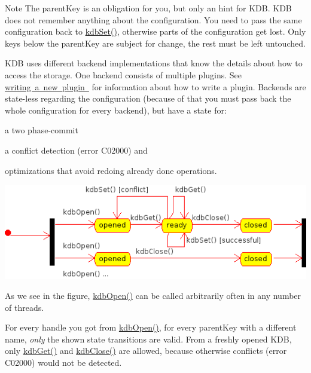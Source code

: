 \begin{DoxyNote}{Note}
The parent\+Key is an obligation for you, but only an hint for K\+DB. K\+DB does not remember anything about the configuration. You need to pass the same configuration back to \mbox{\hyperlink{group__kdb_ga11436b058408f83d303ca5e996832bcf}{kdb\+Set()}}, otherwise parts of the configuration get lost. Only keys below the parent\+Key are subject for change, the rest must be left untouched.
\end{DoxyNote}
K\+DB uses different backend implementations that know the details about how to access the storage. One backend consists of multiple plugins. See \mbox{\hyperlink{group__plugin}{writing a new plugin }} for information about how to write a plugin. Backends are state-\/less regarding the configuration (because of that you must pass back the whole configuration for every backend), but have a state for\+:


\begin{DoxyItemize}
\item a two phase-\/commit
\item a conflict detection (error C02000) and
\item optimizations that avoid redoing already done operations.
\end{DoxyItemize}


\begin{DoxyImage}
\includegraphics[width=\textwidth,height=\textheight/2,keepaspectratio=true]{state.png}
\end{DoxyImage}
 As we see in the figure, \mbox{\hyperlink{group__kdb_ga6808defe5870f328dd17910aacbdc6ca}{kdb\+Open()}} can be called arbitrarily often in any number of threads.

For every handle you got from \mbox{\hyperlink{group__kdb_ga6808defe5870f328dd17910aacbdc6ca}{kdb\+Open()}}, for every parent\+Key with a different name, {\itshape only} the shown state transitions are valid. From a freshly opened K\+DB, only \mbox{\hyperlink{group__kdb_ga28e385fd9cb7ccfe0b2f1ed2f62453a1}{kdb\+Get()}} and \mbox{\hyperlink{group__kdb_gadb54dc9fda17ee07deb9444df745c96f}{kdb\+Close()}} are allowed, because otherwise conflicts (error C02000) would not be detected.

